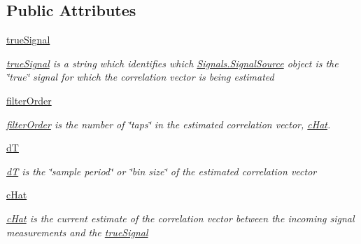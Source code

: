\subsection*{Public Attributes}
\begin{DoxyCompactItemize}
\item 
\hyperlink{classSignalCorrelationSubstate_1_1CorrelationFilter_a67ff75effd8a8a7e34f0f3e8c56ef491}{true\+Signal}
\begin{DoxyCompactList}\small\item\em \hyperlink{classSignalCorrelationSubstate_1_1CorrelationFilter_a67ff75effd8a8a7e34f0f3e8c56ef491}{true\+Signal} is a string which identifies which \hyperlink{classSignals_1_1SignalSource}{Signals.\+Signal\+Source} object is the \char`\"{}true\char`\"{} signal for which the correlation vector is being estimated \end{DoxyCompactList}\item 
\hyperlink{classSignalCorrelationSubstate_1_1CorrelationFilter_a4b49b7bd52c1346cca0342942a5bbbb6}{filter\+Order}
\begin{DoxyCompactList}\small\item\em \hyperlink{classSignalCorrelationSubstate_1_1CorrelationFilter_a4b49b7bd52c1346cca0342942a5bbbb6}{filter\+Order} is the number of \char`\"{}taps\char`\"{} in the estimated correlation vector, \hyperlink{classSignalCorrelationSubstate_1_1CorrelationFilter_ad07b1d484b9ab77a1a8fc215f10faf15}{c\+Hat}. \end{DoxyCompactList}\item 
\hyperlink{classSignalCorrelationSubstate_1_1CorrelationFilter_a500e4823c314d54a21f236b6b896c8eb}{dT}
\begin{DoxyCompactList}\small\item\em \hyperlink{classSignalCorrelationSubstate_1_1CorrelationFilter_a500e4823c314d54a21f236b6b896c8eb}{dT} is the \char`\"{}sample period\char`\"{} or \char`\"{}bin size\char`\"{} of the estimated correlation vector \end{DoxyCompactList}\item 
\hyperlink{classSignalCorrelationSubstate_1_1CorrelationFilter_ad07b1d484b9ab77a1a8fc215f10faf15}{c\+Hat}
\begin{DoxyCompactList}\small\item\em \hyperlink{classSignalCorrelationSubstate_1_1CorrelationFilter_ad07b1d484b9ab77a1a8fc215f10faf15}{c\+Hat} is the current estimate of the correlation vector between the incoming signal measurements and the \hyperlink{classSignalCorrelationSubstate_1_1CorrelationFilter_a67ff75effd8a8a7e34f0f3e8c56ef491}{true\+Signal} \end{DoxyCompactList}\item 

\end{DoxyCompactItemize}
